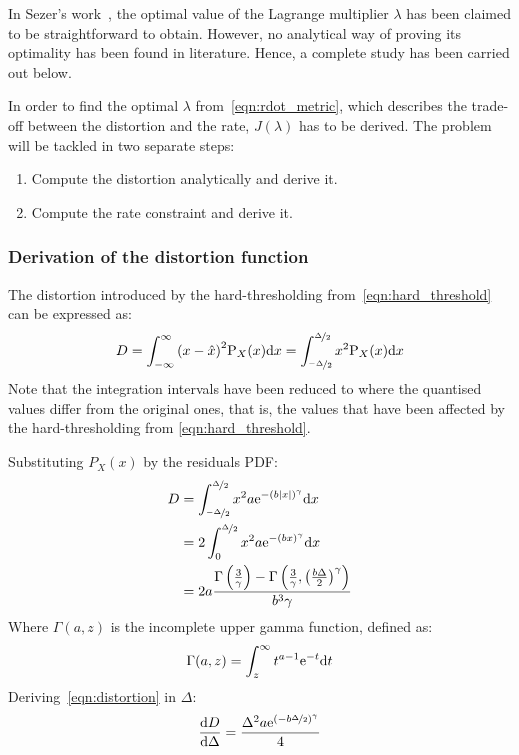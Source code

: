\documentclass[11pt,a4paper,openright,twoside]{book}
\numberwithin{equation}{section} %
\begin{document}
In Sezer's work~\cite{sezer-11-phd,sezer-08-sparse-orthonormal-transforms},
the optimal value of the Lagrange multiplier $\lambda$ has been claimed
to be straightforward to obtain.
However, no analytical way of proving its optimality has been found in
literature.
Hence, a complete study has been carried out below.

In order to find the optimal $\lambda$ from~\eqref{eqn:rdot_metric},
which describes the trade-off between the distortion and the rate,
$J(\lambda)$ has to be derived.
The problem will be tackled in two separate steps:
\begin{enumerate}
	\item Compute the distortion analytically and derive it.
	\item Compute the rate constraint and derive it.
\end{enumerate}

\subsubsection{Derivation of the distortion function}
\label{ssub:derivation_of_the_distortion_function}

The distortion introduced by the hard-thresholding
from~\eqref{eqn:hard_threshold} can be expressed as:
\begin{equation}
	D
	= \int_{-\infty}^{\infty} {(x - \hat x)}^2 \text{P}_X (x)\text{d} x
	= \int_{\nicefrac{-\Delta}{2}}^{\nicefrac{\Delta}{2}}
	\label{eqn:int_distortion}
	x^2\text{P}_X (x) \text{d} x
\end{equation}
Note that the integration intervals have been reduced to where the
quantised values differ from the original ones, that is, the values that
have been affected by the hard-thresholding from
\eqref{eqn:hard_threshold}.

Substituting $P_X(x)$ by the residuals \ac{PDF}:
\begin{align}
	D
	&=\int_{\nicefrac{-\Delta}{2}}^{\nicefrac{\Delta}{2}}
	x^2 a \text{e}^{-{\left(b\vert x \vert\right)}^\gamma} \text{d} x \\
	&=2 \int_0^{\nicefrac{\Delta}{2}}
	x^2 a \text{e}^{-{\left(b x \right)}^\gamma} \text{d} x\\
	&=
		2a \frac{\Gamma\left(\frac{3}{\gamma}\right)-
		\Gamma\left(
		\frac{3}{\gamma},{\left(\frac{b\Delta}{2}\right)}^\gamma
		\right)}{b^3\gamma}
	\label{eqn:distortion}
\end{align}
Where $\Gamma(a,z)$ is the incomplete upper gamma function, defined as:
\begin{equation}
	\Gamma(a,z)=\int_z^\infty t^{a-1}\text{e}^{-t}\text{d} t
\end{equation}
Deriving~\eqref{eqn:distortion} in $\Delta$:
\begin{equation}
	\frac{\text{d} D}{\text{d}\Delta} =
	\frac{\Delta^2 a \text{e}^{{(-b\nicefrac{\Delta}{2})}^\gamma}}{4}
	\label{eqn:diff_distortion}
\end{equation}
\end{document}
